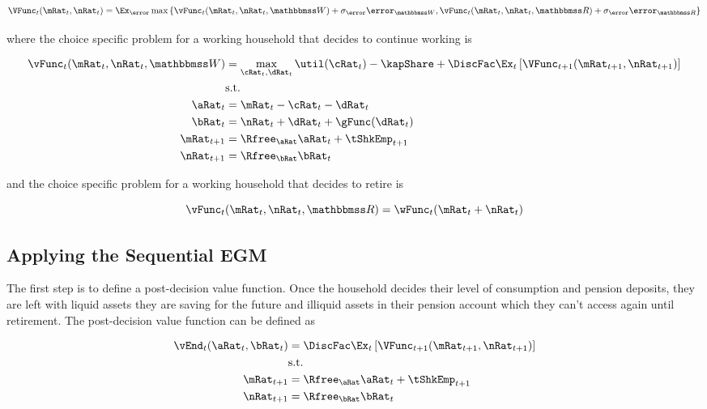 \documentclass[\econtexRoot/SequentialEGM]{subfiles}
\begin{document}
\begin{equation}
  \VFunc_{t}(\mRat_{t}, \nRat_{t}) = \Ex_\error \max \left\{
  \vFunc_{t}(\mRat_{t}, \nRat_{t}, \Work) + \sigma_{\error}
  \error_{\Work} ,
  \vFunc_{t}(\mRat_{t}, \nRat_{t}, \Retire) + \sigma_{\error}
  \error_{\Retire} \right\}
\end{equation}

where the choice specific problem for a working household that decides to
continue working is

\begin{equation}
  \begin{split}
    \vFunc_{t}(\mRat_{t}, \nRat_{t}, \Work) & = \max_{\cRat_{t},
      \dRat_{t}} \util(\cRat_{t}) - \kapShare + \DiscFac
    \Ex_{t} \left[
      \VFunc_{t+1}(\mRat_{t+1}, \nRat_{t+1})
      \right] \\
    & \text{s.t.} \\
    \aRat_{t} & = \mRat_{t} - \cRat_{t} - \dRat_{t} \\
    \bRat_{t} & = \nRat_{t} + \dRat_{t} + \gFunc(\dRat_{t}) \\
    \mRat_{t+1} & = \Rfree_{\aRat} \aRat_{t} + \tShkEmp_{t+1} \\
    \nRat_{t+1} & = \Rfree_{\bRat} \bRat_{t}
  \end{split}
\end{equation}

and the choice specific problem for a working household that decides to retire
is

\begin{equation}
  \vFunc_{t}(\mRat_{t}, \nRat_{t}, \Retire) =
  \wFunc_{t}(\mRat_{t}+\nRat_{t})
\end{equation}

\subsection{Applying the Sequential EGM}

The first step is to define a post-decision value function. Once the household
decides their level of consumption and pension deposits, they are left with
liquid assets they are saving for the future and illiquid assets in their
pension account which they can't access again until retirement. The
post-decision value function can be defined as

\begin{equation}
  \begin{split}
    \vEnd_{t}(\aRat_{t}, \bRat_{t}) & =  \DiscFac
    \Ex_{t} \left[ \VFunc_{t+1}(\mRat_{t+1}, \nRat_{t+1}) \right] \\
    & \text{s.t.} \\
    \mRat_{t+1} & = \Rfree_{\aRat} \aRat_{t} + \tShkEmp_{t+1} \\
    \nRat_{t+1} & = \Rfree_{\bRat} \bRat_{t}
  \end{split}
\end{equation}
\end{document}
